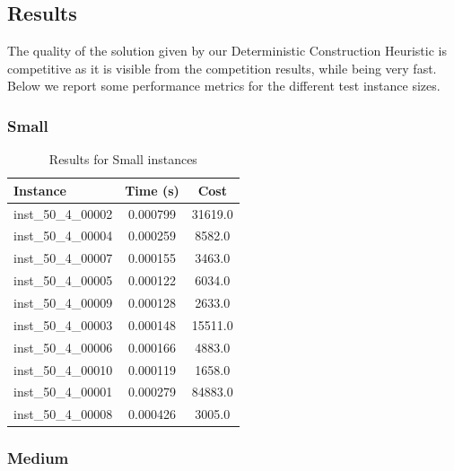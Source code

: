 \documentclass{article}
\begin{document}
\subsection*{Results}
The quality of the solution given by our Deterministic Construction Heuristic is competitive as it is visible from the competition results, while being very fast. Below we report some performance metrics for the different test instance sizes.

\subsubsection*{Small}
\begin{table}[h!]
\centering
\begin{tabular}{lcc}
\toprule
\textbf{Instance}         & \textbf{Time (s)} & \textbf{Cost} \\ 
\midrule
inst\_50\_4\_00002 & 0.000799 & 31619.0 \\ 
inst\_50\_4\_00004 & 0.000259 & 8582.0  \\ 
inst\_50\_4\_00007 & 0.000155 & 3463.0  \\ 
inst\_50\_4\_00005 & 0.000122 & 6034.0  \\ 
inst\_50\_4\_00009 & 0.000128 & 2633.0  \\ 
inst\_50\_4\_00003 & 0.000148 & 15511.0 \\ 
inst\_50\_4\_00006 & 0.000166 & 4883.0  \\ 
inst\_50\_4\_00010 & 0.000119 & 1658.0  \\ 
inst\_50\_4\_00001 & 0.000279 & 84883.0 \\ 
inst\_50\_4\_00008 & 0.000426 & 3005.0  \\ 
\bottomrule
\end{tabular}
\caption{Results for Small instances}
\end{table}

\subsubsection*{Medium}
\end{document}

